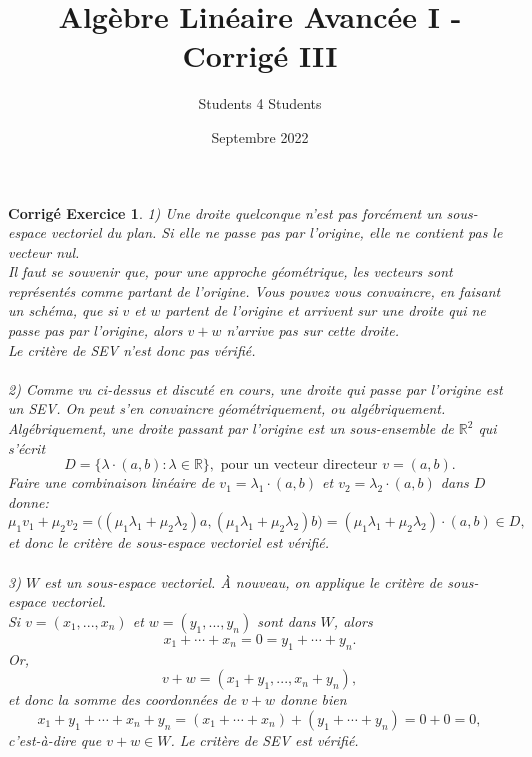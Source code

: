 \documentclass[11pt,french,table]{article}
\title{Algèbre Linéaire Avancée I - Corrigé III}
\author{Students 4 Students}
\date{Septembre 2022}
\theoremstyle{exercice}
\theoremstyle{corrigé}
\newtheorem{corrigé}{Corrigé Exercice}
\begin{document}
\maketitle
\vspace{1em}
\begin{corrigé}
1) Une droite quelconque n'est pas forcément un sous-espace vectoriel du plan. Si elle ne passe pas par l'origine, elle ne contient pas le vecteur nul. \\
Il faut se souvenir que, pour une approche géométrique, les vecteurs sont représentés comme \textit{partant de l'origine}. Vous pouvez vous convaincre, en faisant un schéma, que si $v$ et $w$ partent de l'origine et arrivent sur une droite \textit{qui ne passe pas par l'origine}, alors $v+w$ n'arrive \textit{pas} sur cette droite. \\
Le critère de SEV n'est donc pas vérifié.
\\
\\
2) Comme vu ci-dessus et discuté en cours, une droite qui passe par l'origine est un SEV. On peut s'en convaincre géométriquement, ou algébriquement. \\
Algébriquement, une droite passant par l'origine est un sous-ensemble de $\mathbb{R}^2$ qui s'écrit
$$D = \{  \lambda \cdot (a, b) : \lambda \in \mathbb{R} \}, \text{ pour un vecteur directeur } v= (a,b).$$
Faire une combinaison linéaire de $v_1 = \lambda_1 \cdot (a, b)$ et $v_2 = \lambda_2 \cdot (a,b)$ dans $D$ donne:
$$\mu_1 v_1 + \mu_2 v_2 = \big( (\mu_1 \lambda_1 + \mu_2\lambda_2) a, (\mu_1 \lambda_1 + \mu_2\lambda_2) b \big) = (\mu_1 \lambda_1 + \mu_2\lambda_2) \cdot (a,b) \in D,$$
et donc le critère de sous-espace vectoriel est vérifié. \\
\\
3) $W$ est un sous-espace vectoriel. À nouveau, on applique le critère de sous-espace vectoriel. \\
Si $v=(x_1,...,x_n)$ et $w=(y_1,...,y_n)$ sont dans $W$, alors
$$x_1 + \cdots + x_n = 0 = y_1 + \cdots + y_n.$$
Or,
$$v+w = (x_1 + y_1,...,x_n+y_n),$$
et donc la somme des coordonnées de $v+w$ donne bien 
$$x_1 + y_1 + \cdots + x_n + y_n = (x_1 + \cdots + x_n) + (y_1 + \cdots + y_n) = 0 + 0 = 0,$$
c'est-à-dire que $v+w \in W$. Le critère de SEV est vérifié.
\end{corrigé}
\end{document}
